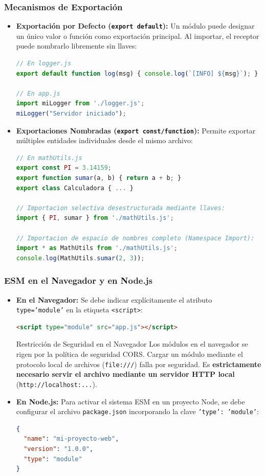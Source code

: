 \subsubsection{Mecanismos de Exportación}
\begin{itemize}
    \item \textbf{Exportación por Defecto (\texttt{export default}):} Un módulo puede designar un único valor o función como exportación principal. Al importar, el receptor puede nombrarlo libremente sin llaves:
\begin{lstlisting}[language=javascript]
// En logger.js
export default function log(msg) { console.log(`[INFO] ${msg}`); }

// En app.js
import miLogger from './logger.js';
miLogger("Servidor iniciado");
\end{lstlisting}
    \item \textbf{Exportaciones Nombradas (\texttt{export const/function}):} Permite exportar múltiples entidades individuales desde el mismo archivo:
\begin{lstlisting}[language=javascript]
// En mathUtils.js
export const PI = 3.14159;
export function sumar(a, b) { return a + b; }
export class Calculadora { ... }

// Importacion selectiva desestructurada mediante llaves:
import { PI, sumar } from './mathUtils.js';

// Importacion de espacio de nombres completo (Namespace Import):
import * as MathUtils from './mathUtils.js';
console.log(MathUtils.sumar(2, 3));
\end{lstlisting}
\end{itemize}

\subsubsection{ESM en el Navegador y en Node.js}
\begin{itemize}
    \item \textbf{En el Navegador:} Se debe indicar explícitamente el atributo \texttt{type='module'} en la etiqueta \texttt{<script>}:
\begin{lstlisting}[language=html]
<script type="module" src="app.js"></script>
\end{lstlisting}
    \begin{importante}{Restricción de Seguridad en el Navegador}
    Los módulos en el navegador se rigen por la política de seguridad CORS. Cargar un módulo mediante el protocolo local de archivos (\texttt{file:///}) falla por seguridad. Es \textbf{estrictamente necesario servir el archivo mediante un servidor HTTP local} (\texttt{http://localhost:...}).
    \end{importante}
    \item \textbf{En Node.js:} Para activar el sistema ESM en un proyecto Node, se debe configurar el archivo \texttt{package.json} incorporando la clave \texttt{'type': 'module'}:
\begin{lstlisting}[language=json]
{
  "name": "mi-proyecto-web",
  "version": "1.0.0",
  "type": "module"
}
\end{lstlisting}
\end{itemize}

